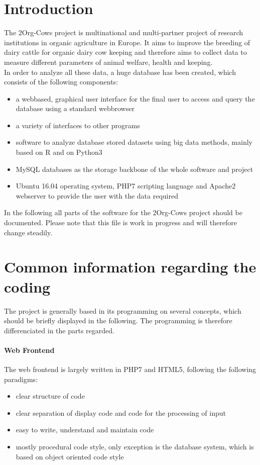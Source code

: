 
\section{Introduction}

The 2Org-Cows project is multinational and multi-partner project of research institutions in organic agriculture in Europe. It aims to improve the breeding of dairy cattle for organic dairy cow keeping
and therefore aims to collect data to measure different parameters of animal welfare, health and keeping.\\
In order to analyze all these data, a huge database has been created, which consists of the following components:
\begin{itemize}
 \item a webbased, graphical user interface for the final user to access and query the database using a standard webbrowser
 \item a variety of interfaces to other programs
 \item software to analyze database stored datasets using big data methods, mainly based on R and on Python3
 \item MySQL databases as the storage backbone of the whole software and project
 \item Ubuntu 16.04 operating system, PHP7 scripting language and Apache2 webserver to provide the user with the data required
\end{itemize}
In the following all parts of the software for the 2Org-Cows project should be documented. Please note that this file is work in progress and will therefore change steadily.

\section{Common information regarding the coding}
The project is generally based in its programming on several concepts, which should be briefly displayed in the following. The programming is therefore differenciated in the parts 
regarded. 
\paragraph{Web Frontend}
The web frontend is largely written in PHP7 and HTML5, following the following paradigms: 
\begin{itemize}
 \item clear structure of code
 \item clear separation of display code and code for the processing of input
 \item easy to write, understand and maintain code
 \item mostly procedural code style, only exception is the database system, which is based on object oriented code style
\end{itemize}
